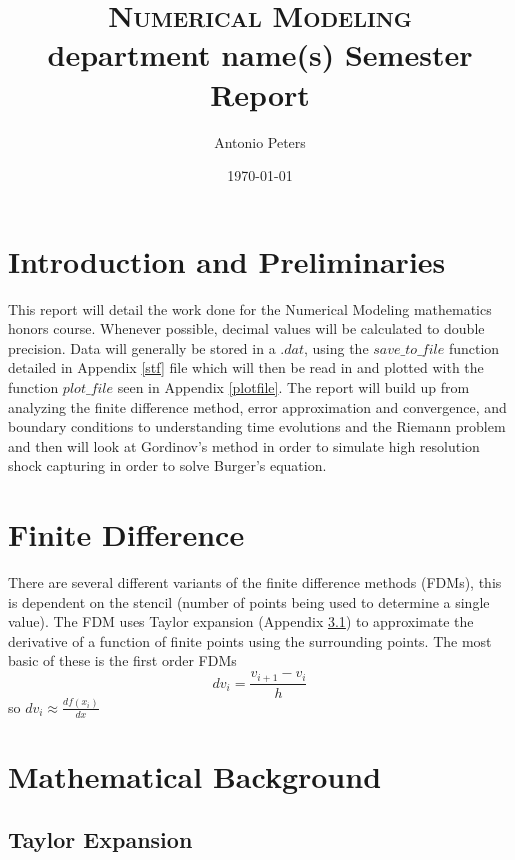 \documentclass{article}%
\title{
\textsc{Numerical Modeling} \\ [25pt] %
department name(s)
\huge Semester Report \\ %
}
\author{Antonio Peters} %
\date{\today} %
\begin{document}
\maketitle %

\section{Introduction and Preliminaries}
This report will detail the work done for the Numerical Modeling mathematics honors course. Whenever possible, decimal values will be calculated to double precision. Data will generally be stored in a $.dat$, using the $save\_to\_file$ function detailed in Appendix \ref{stf} file which will then be read in and plotted with the function $plot\_file$ seen in Appendix \ref{plotfile}. The report will build up from analyzing the finite difference method, error approximation and convergence, and boundary conditions to understanding time evolutions and the Riemann problem and then will look at Gordinov's method in order to simulate high resolution shock capturing in order to solve Burger's equation.
\section{Finite Difference}
There are several different variants of the  finite difference methods (FDMs), this is dependent on the stencil (number of points being used to determine a single value). The FDM uses Taylor expansion (Appendix \ref{taylor}) to approximate the derivative of a function of finite points using the surrounding points.
\linebreak
\linebreak
The most basic of these is the first order FDMs
\begin{equation}
  dv_i = \frac{v_{i+1} - v_i}{h}
\end{equation}
so $dv_i \approx \frac{df(x_i)}{dx}$
\pagebreak
\appendix
\section{Mathematical Background}
\subsection{Taylor Expansion}\label{taylor}
\end{document}
